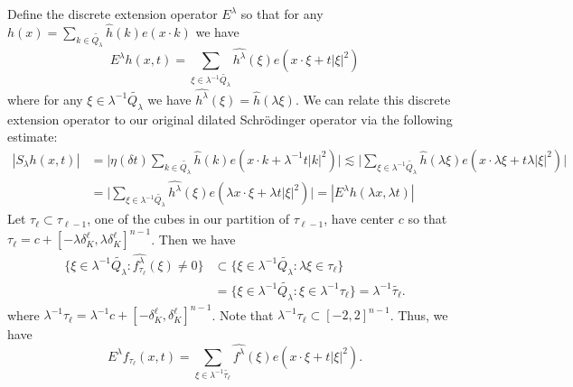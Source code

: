 \documentclass[11pt]{amsart}
\numberwithin{equation}{section}
\newcommand{\la}{\lambda}
\newcommand{\Sl}{S_{\la}}
\newcommand{\extensionop}[2]{E_{#1}^{\la}{#2}}
\newcommand{\dK}[1]{\delta_{K}^{#1}}
\begin{document}
Define the discrete extension operator $\extensionop{}{}$ so that for any $h(x) = \sum_{k \in \tilde{Q_\la}}\widehat{h}(k)e(x \cdot k)$ we have
\begin{equation}
    \extensionop{}{h}(x,t) = \sum_{\xi \in \la^{-1}\tilde{Q_{\la}}} \widehat{h^{\la}}(\xi)e(x \cdot \xi + t|\xi|^2)
\end{equation}
where for any $\xi \in \la^{-1}\tilde{Q_{\la}}$ we have $\widehat{h^{\la}}(\xi) = \widehat{h}(\la \xi)$. We can relate this discrete extension operator to our original dilated Schr\"{o}dinger operator via the following estimate:
\begin{equation} \label{extension op vs dilated schrodinger op}
\begin{split}
    |\Sl h(x,t)|  &= \big|\eta(\delta t) \sum_{k \in \tilde{Q_{\la}}} \widehat{h}(k)e(x \cdot k + \la^{-1}t|k|^2) \big| \lesssim \big| \sum_{\xi \in \la^{-1}\tilde{Q_{\la}}}\widehat{h}(\la \xi)e(x \cdot \la \xi + t \la |\xi|^2)\big| \\
    & = \big| \sum_{\xi \in \la^{-1}\tilde{Q_{\la}}}\widehat{h^{\la}}(\xi)e(\la x \cdot \xi + \la t  |\xi|^2)\big| = |\extensionop{}{h}(\la x, \la t)|
\end{split}
\end{equation}
Let $\tau_{\ell} \subset \tau_{\ell - 1}$, one of the cubes in our partition of $\tau_{\ell - 1}$, have center $c$ so that $\tau_{\ell} = c + [- \la\dK{\ell}, \la \dK{\ell}]^{n-1}$. Then we have 
\begin{equation}
\begin{split}
        \{ \xi \in \la^{-1}\tilde{Q_{\la}} : \widehat{f_{\tau_{\ell}}^{\la}}(\xi) \neq 0 \} &\subset \{\xi \in \la^{-1}\tilde{Q_{\la}} : \la \xi \in \tau_{\ell}\} \\
        &= \{\xi \in \la^{-1}\tilde{Q_{\la}} : \xi \in \la^{-1}\tau_{\ell} \} = \la^{-1}\tilde{\tau_{\ell}}. 
\end{split}
\end{equation}
where $\la^{-1} \tau_{\ell} = \la^{-1}c + [-\dK{\ell}, \dK{\ell}]^{n-1}$. Note that $\la^{-1}\tau_{\ell} \subset  [-2,2]^{n-1} $. Thus, we have
\begin{equation}
    \extensionop{}{f_{\tau_{\ell}}}(x,t) = \sum_{\xi \in \la^{-1}\tilde{\tau_{\ell}}} \widehat{f^{\la}}(\xi)e(x \cdot \xi + t|\xi|^2).
\end{equation}
\end{document}
